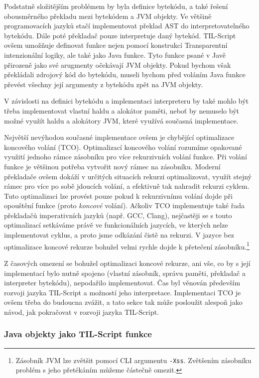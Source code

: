 Podstatně složitějším problémem by byla definice bytekódu, a také řešení obousměrného překladu mezi
bytekódem a JVM objekty. Ve většině programovacích jazyků stačí implementovat překlad AST
do interpretovatelného bytekódu. Dále poté překladač pouze interpretuje daný bytekód. TIL-Script
ovšem umožňuje definovat funkce nejen pomocí konstrukcí Transparentní intenzionální logiky, ale také
jako Java funkce. Tyto funkce psané v Javě přirozeně jako své arugmenty očekávají JVM objekty.
Pokud bychom však překládali zdrojový kód do bytekódu, museli bychom před voláním Java funkce
převést všechny její argumenty z bytekódu zpět na JVM objekty.

V závislosti na definici bytekódu a implementaci interpreteru by také mohlo být třeba implementovat
vlastní haldu a alokátor paměti, neboť by nemuselo být možné využít haldu a alokátory JVM, které
využívá současná implementace.

Největší nevýhodou současné implementace ovšem je chybějící optimalizace koncového volání (TCO).
Optimalizací koncového volání rozumíme opakované využití jednoho rámce zásobníku pro více
rekurzivních volání funkce. Při volání funkce je většinou potřeba vytvořit nový rámec na zásobníku.
Moderní překladače ovšem dokáží v určitých situacích rekurzi optimalizovat, využít stejný rámec
pro více po sobě jdoucích volání, a efektivně tak nahradit rekurzi cyklem. Tuto optimalizaci lze
provést pouze pokud k rekurzivnímu volání dojde při opouštění funkce (proto \textit{koncové}
volání). Ačkoliv TCO implementuje také řada překladačů imperativních jazyků (např. GCC, Clang),
nejčastěji se s touto optimalizací setkáváme právě ve funkcionálních jazycích, ve kterých nelze
implementovat cyklus, a proto jsme odkázání čistě na rekurzi. V jazyce bez optimalizace koncové
rekurze bohužel velmi rychle dojde k přetečení zásobníku.\footnote{
  Zásobník JVM lze zvětšit pomocí CLI argumentu \lstinline{-Xss}. Zvětšením zásobníku problém s jeho
  přetékáním můžeme částečně omezit.
}

Z časových omezení se bohužel optimalizaci koncové rekurze, ani vše, co by s její implementací bylo
nutně spojeno (vlastní zásobník, správu paměti, překladač a interpreter bytekódu), nepodařilo
implementovat. Čas byl věnován především rozvoji jazyka TIL-Script a možností jeho interpretace.
Implementaci TCO je ovšem třeba do budoucna zvážit, a tato sekce tak může posloužit alespoň jako
návod, jak pokračovat v rozvoji jazyka TIL-Script.

\subsubsection{Java objekty jako TIL-Script funkce}

